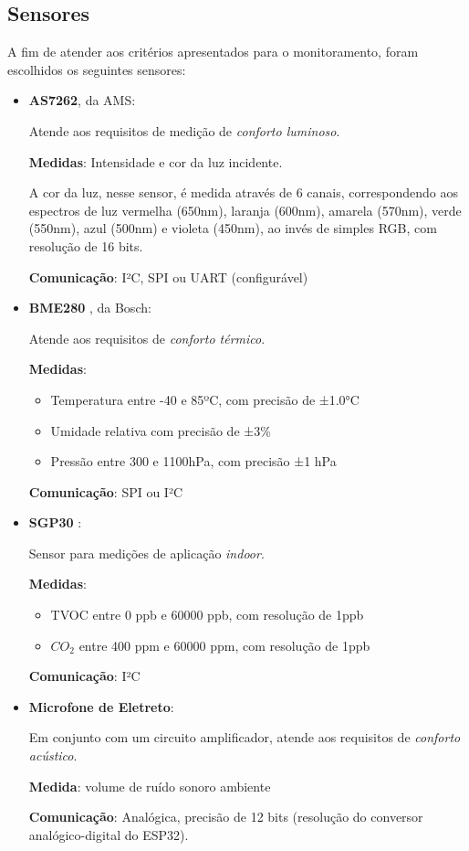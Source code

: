 \documentclass[../monografia.tex]{subfiles}
\begin{document}
\subsection{Sensores}
A fim de atender aos critérios apresentados para o monitoramento, foram escolhidos os seguintes sensores: 
\begin{itemize}
\item \textbf{AS7262}\cite{as7262}, da AMS: 

Atende aos requisitos de medição de \textit{conforto luminoso}. 

\textbf{Medidas}: Intensidade e cor da luz incidente.

A cor da luz, nesse sensor, é medida através de 6 canais, correspondendo aos espectros de luz vermelha (650nm), laranja (600nm), amarela (570nm), verde (550nm), azul (500nm) e violeta (450nm), ao invés de simples RGB, com resolução de 16 bits.

\textbf{Comunicação}: I²C, SPI ou UART (configurável)

\item \textbf{BME280} \cite{bme280}, da Bosch: 

Atende aos requisitos de \textit{conforto térmico}. 

\textbf{Medidas}: 
    \begin{itemize}
    \item Temperatura entre -40 e 85ºC, com precisão de ±1.0°C
    \item Umidade relativa com precisão de ±3\%
    \item Pressão entre 300 e 1100hPa, com precisão ±1 hPa
    \end{itemize}

\textbf{Comunicação}: SPI ou I²C

\item \textbf{SGP30} \cite{sgp30}:

Sensor para medições de aplicação \textit{indoor}. 

\textbf{Medidas}:
    \begin{itemize}
    \item TVOC entre 0 ppb e 60000 ppb, com resolução de 1ppb
    \item $CO_{2}$ entre 400 ppm e 60000 ppm, com resolução de 1ppb
    \end{itemize}

\textbf{Comunicação}: I²C

\item \textbf{Microfone de Eletreto}:

Em conjunto com um circuito amplificador, atende aos requisitos de \textit{conforto acústico}. 

\textbf{Medida}: volume de ruído sonoro ambiente

\textbf{Comunicação}: Analógica, precisão de 12 bits (resolução do conversor analógico-digital do ESP32). 
\end{itemize}
\end{document}
